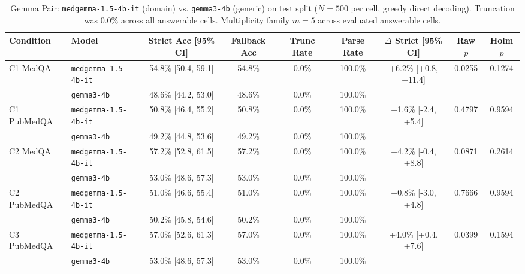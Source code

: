 \begin{table}[t]
\centering
\small
\caption{Gemma Pair: \texttt{medgemma-1.5-4b-it} (domain) vs. \texttt{gemma3-4b} (generic) on test split ($N=500$ per cell, greedy direct decoding). Truncation was 0.0\% across all answerable cells. Multiplicity family $m=5$ across evaluated answerable cells.}
\label{tab:gemma_pair}
\begin{tabular}{llccccccc}
\toprule
Condition & Model & Strict Acc [95\% CI] & Fallback Acc & Trunc Rate & Parse Rate & $\Delta$ Strict [95\% CI] & Raw $p$ & Holm $p$ \\
\midrule

C1 MedQA & \texttt{medgemma-1.5-4b-it} & 54.8\% [50.4, 59.1] & 54.8\% & 0.0\% & 100.0\% & \multirow{2}{*}{+6.2\% [+0.8, +11.4]} & \multirow{2}{*}{0.0255} & \multirow{2}{*}{0.1274} \\

 & \texttt{gemma3-4b} & 48.6\% [44.2, 53.0] & 48.6\% & 0.0\% & 100.0\% & & & \\

\midrule

C1 PubMedQA & \texttt{medgemma-1.5-4b-it} & 50.8\% [46.4, 55.2] & 50.8\% & 0.0\% & 100.0\% & \multirow{2}{*}{+1.6\% [-2.4, +5.4]} & \multirow{2}{*}{0.4797} & \multirow{2}{*}{0.9594} \\

 & \texttt{gemma3-4b} & 49.2\% [44.8, 53.6] & 49.2\% & 0.0\% & 100.0\% & & & \\

\midrule

C2 MedQA & \texttt{medgemma-1.5-4b-it} & 57.2\% [52.8, 61.5] & 57.2\% & 0.0\% & 100.0\% & \multirow{2}{*}{+4.2\% [-0.4, +8.8]} & \multirow{2}{*}{0.0871} & \multirow{2}{*}{0.2614} \\

 & \texttt{gemma3-4b} & 53.0\% [48.6, 57.3] & 53.0\% & 0.0\% & 100.0\% & & & \\

\midrule

C2 PubMedQA & \texttt{medgemma-1.5-4b-it} & 51.0\% [46.6, 55.4] & 51.0\% & 0.0\% & 100.0\% & \multirow{2}{*}{+0.8\% [-3.0, +4.8]} & \multirow{2}{*}{0.7666} & \multirow{2}{*}{0.9594} \\

 & \texttt{gemma3-4b} & 50.2\% [45.8, 54.6] & 50.2\% & 0.0\% & 100.0\% & & & \\

\midrule

C3 PubMedQA & \texttt{medgemma-1.5-4b-it} & 57.0\% [52.6, 61.3] & 57.0\% & 0.0\% & 100.0\% & \multirow{2}{*}{+4.0\% [+0.4, +7.6]} & \multirow{2}{*}{0.0399} & \multirow{2}{*}{0.1594} \\

 & \texttt{gemma3-4b} & 53.0\% [48.6, 57.3] & 53.0\% & 0.0\% & 100.0\% & & & \\

\bottomrule
\end{tabular}
\end{table}

